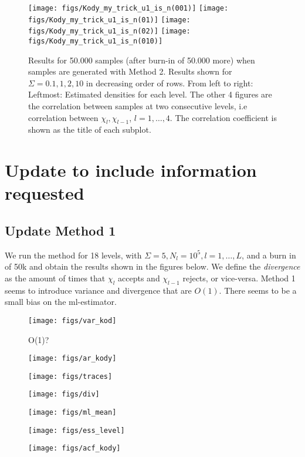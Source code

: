 \documentclass[a4paper]{article}
\begin{document}
\begin{figure}[H]
	\centering
	\texttt{[image: figs/Kody\_my\_trick\_u1\_is\_n(001)]}
	\texttt{[image: figs/Kody\_my\_trick\_u1\_is\_n(01)]}
	\texttt{[image: figs/Kody\_my\_trick\_u1\_is\_n(02)]}
		\texttt{[image: figs/Kody\_my\_trick\_u1\_is\_n(010)]}
	\caption{Results for 50.000 samples (after burn-in of 50.000 more) when samples are generated with Method 2. Results shown for $\Sigma=0.1,1,2,10$ in decreasing order of rows. From left to right: Leftmost: Estimated densities for each level. The other 4 figures are the correlation between samples at two consecutive levels, i.e correlation between $\chi_l,\chi_{l-1}$, $l=1,\dots,4$. The correlation coefficient is shown as the title of each subplot. }

	\label{fig:kodymytricku1isn01}
\end{figure}
\color{red}\section{Update to include information requested}
\color{red} \subsection{Update Method 1}
We run the method for 18 levels, with $\Sigma =5, N_l=10^5,l=1,\dots,L$, and a burn in of 50k and obtain the results shown in the figures below. We define the \textit{divergence} as the amount of times that $\chi_l$ accepts and $\chi_{l-1}$ rejects, or vice-versa. Method 1 seems to introduce variance and divergence that are $O(1)$. There seems to be a small bias on the ml-estimator.
\begin{figure}[H]
	\centering
	\texttt{[image: figs/var\_kod]}
	\caption{O(1)?}
	\label{fig:varkod}
\end{figure}
\begin{figure}[H]
	\centering
	\texttt{[image: figs/ar\_kody]}
	\caption{}
	\label{fig:arkody}
\end{figure}
\begin{figure}[H]
	\centering
	\texttt{[image: figs/traces]}
	\caption{}
	\label{fig:traces}
\end{figure}
\begin{figure}[H]
	\centering
	\texttt{[image: figs/div]}
	\caption{}
	\label{fig:div}
\end{figure}
\begin{figure}[H]
	\centering
	\texttt{[image: figs/ml\_mean]}
	\caption{}
	\label{fig:mlmean}
\end{figure}
\begin{figure}[H]
	\centering
	\texttt{[image: figs/ess\_level]}
	\caption{}
	\label{fig:esslevel}
\end{figure}
\begin{figure}
	\centering
	\texttt{[image: figs/acf\_kody]}
	\caption{}
	\label{fig:acfkody}
\end{figure}
\end{document}

